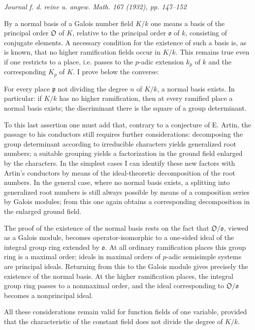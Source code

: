 \documentclass[11pt]{article}
\providecommand{\frako}{\mathfrak o}
\providecommand{\frakp}{\mathfrak p}
\providecommand{\frakO}{\mathfrak O}
\begin{document}
\begin{center}
\emph{Journal f. d. reine u. angew. Math. 167 (1932), pp. 147--152}
\end{center}

By a normal basis of a Galois number field \(K/k\) one means a basis of the principal order \(\frakO\) of \(K\), relative to the principal order \(\frako\) of \(k\), consisting of conjugate elements. A necessary condition for the existence of such a basis is, as is known, that no higher ramification fields occur in \(K/k\). This remains true even if one restricts to a place, i.e. passes to the \(p\)-adic extension \(k_p\) of \(k\) and the corresponding \(K_p\) of \(K\). I prove below the converse:

For every place \(\frakp\) not dividing the degree \(n\) of \(K/k\), a normal basis exists. In particular: if \(K/k\) has no higher ramification, then at every ramified place a normal basis exists; the discriminant there is the square of a group determinant.

To this last assertion one must add that, contrary to a conjecture of E. Artin, the passage to his conductors still requires further considerations: decomposing the group determinant according to irreducible characters yields generalized root numbers; a suitable grouping yields a factorization in the ground field enlarged by the characters. In the simplest cases I can identify these new factors with Artin's conductors by means of the ideal-theoretic decomposition of the root numbers. In the general case, where no normal basis exists, a splitting into generalized root numbers is still always possible by means of a composition series by Galois modules; from this one again obtains a corresponding decomposition in the enlarged ground field.

The proof of the existence of the normal basis rests on the fact that \(\frakO/\frako\), viewed as a Galois module, becomes operator-isomorphic to a one-sided ideal of the integral group ring extended by \(\frako\). At all ordinary ramification places this group ring is a maximal order; ideals in maximal orders of \(p\)-adic semisimple systems are principal ideals. Returning from this to the Galois module gives precisely the existence of the normal basis. At the higher ramification places, the integral group ring passes to a nonmaximal order, and the ideal corresponding to \(\frakO/\frako\) becomes a nonprincipal ideal.

All these considerations remain valid for function fields of one variable, provided that the characteristic of the constant field does not divide the degree of \(K/k\).
\end{document}
